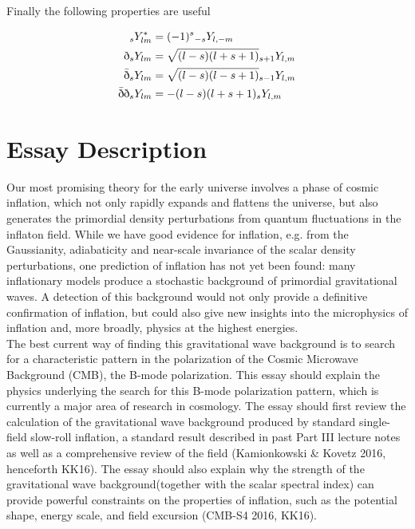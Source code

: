 \documentclass[a4paper,11pt]{article}
\newcommand{\sr}{\text{\normalfont\dh}}
\renewcommand{\sl}{\bar{\text{\normalfont\dh}}}
\begin{document}
Finally the following properties are useful

\begin{align}
{}_sY_{lm}^* &= (-1)^s {}_{-s}Y_{l,-m}\\
\sr {}_sY_{lm} &= \sqrt{(l-s)(l+s+1)}{}_{s+1}Y_{l,m}\\
\sl {}_sY_{lm} &= \sqrt{(l-s)(l-s+1)}{}_{s-1}Y_{l,m}\\
\sl\sr {}_sY_{lm} &= -(l-s)(l+s+1){}_{s}Y_{l,m}
\label{propertiesofspin}
\end{align}

\section{Essay Description}
Our most promising theory for the early universe involves a phase of cosmic inflation, which not only rapidly expands and flattens the universe, but also generates the primordial density perturbations from quantum fluctuations in the inflaton field. While we have good evidence for inflation, e.g. from the Gaussianity, adiabaticity and near-scale invariance of the scalar density perturbations, one prediction of inflation has not yet been found: many inflationary models produce a stochastic background of primordial gravitational waves. A detection of this background would not only provide a definitive confirmation of inflation, but could also give new insights into the microphysics of inflation and, more broadly, physics at the highest energies.\\

The best current way of finding this gravitational wave background is to search for a characteristic pattern in the polarization of the Cosmic Microwave Background (CMB), the B-mode polarization. This essay should explain the physics underlying the search for this B-mode polarization pattern, which is currently a major area of research in cosmology.
The essay should first review the calculation of the gravitational wave background produced
by standard single-field slow-roll inflation, a standard result described in past Part III lecture notes as well as a comprehensive review of the field (Kamionkowski \& Kovetz 2016, henceforth KK16). The essay should also explain why the strength of the gravitational wave background(together with the scalar spectral index) can provide powerful constraints on the properties of inflation, such as the potential shape, energy scale, and field excursion (CMB-S4 2016, KK16).\\
\end{document}
